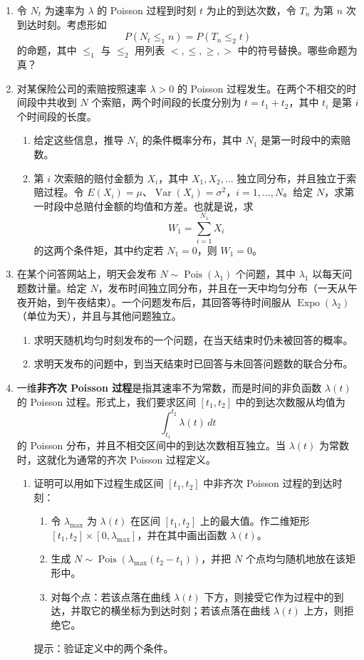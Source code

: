 \documentclass[UTF8,12pt,a4paper,fontset=fandol]{ctexart}
\begin{document}
\begin{enumerate}
  \item 令 $N_t$ 为速率为 $\lambda$ 的 Poisson 过程到时刻 $t$ 为止的到达次数，令 $T_n$ 为第 $n$ 次到达时刻。考虑形如
  \[
    P(N_t \le_1 n)=P(T_n \le_2 t)
  \]
  的命题，其中 $\le_1$ 与 $\le_2$ 用列表 $<,\le,\ge,>$ 中的符号替换。哪些命题为真？

  \item 对某保险公司的索赔按照速率 $\lambda>0$ 的 Poisson 过程发生。在两个不相交的时间段中共收到 $N$ 个索赔，两个时间段的长度分别为 $t=t_1+t_2$，其中 $t_i$ 是第 $i$ 个时间段的长度。
  \begin{enumerate}
    \item 给定这些信息，推导 $N_1$ 的条件概率分布，其中 $N_1$ 是第一时段中的索赔数。
    \item 第 $i$ 次索赔的赔付金额为 $X_i$，其中 $X_1,X_2,\ldots$ 独立同分布，并且独立于索赔过程。令 $E(X_i)=\mu$、$\operatorname{Var}(X_i)=\sigma^2$，$i=1,\ldots,N$。给定 $N$，求第一时段中总赔付金额的均值和方差。也就是说，求
    \[
      W_1=\sum_{i=1}^{N_1}X_i
    \]
    的这两个条件矩，其中约定若 $N_1=0$，则 $W_1=0$。
  \end{enumerate}

  \item 在某个问答网站上，明天会发布 $N\sim\operatorname{Pois}(\lambda_1)$ 个问题，其中 $\lambda_1$ 以每天问题数计量。给定 $N$，发布时间独立同分布，并且在一天中均匀分布（一天从午夜开始，到午夜结束）。一个问题发布后，其回答等待时间服从 $\operatorname{Expo}(\lambda_2)$（单位为天），并且与其他问题独立。
  \begin{enumerate}
    \item 求明天随机均匀时刻发布的一个问题，在当天结束时仍未被回答的概率。
    \item 求明天发布的问题中，到当天结束时已回答与未回答问题数的联合分布。
  \end{enumerate}

  \item 一维\textbf{非齐次 Poisson 过程}是指其速率不为常数，而是时间的非负函数 $\lambda(t)$ 的 Poisson 过程。形式上，我们要求区间 $[t_1,t_2]$ 中的到达次数服从均值为
  \[
    \int_{t_1}^{t_2}\lambda(t)\,dt
  \]
  的 Poisson 分布，并且不相交区间中的到达次数相互独立。当 $\lambda(t)$ 为常数时，这就化为通常的齐次 Poisson 过程定义。
  \begin{enumerate}
    \item 证明可以用如下过程生成区间 $[t_1,t_2]$ 中非齐次 Poisson 过程的到达时刻：
    \begin{enumerate}
      \item 令 $\lambda_{\max}$ 为 $\lambda(t)$ 在区间 $[t_1,t_2]$ 上的最大值。作二维矩形 $[t_1,t_2]\times[0,\lambda_{\max}]$，并在其中画出函数 $\lambda(t)$。
      \item 生成 $N\sim\operatorname{Pois}(\lambda_{\max}(t_2-t_1))$，并把 $N$ 个点均匀随机地放在该矩形中。
      \item 对每个点：若该点落在曲线 $\lambda(t)$ 下方，则接受它作为过程中的到达，并取它的横坐标为到达时刻；若该点落在曲线 $\lambda(t)$ 上方，则拒绝它。
    \end{enumerate}
    提示：验证定义中的两个条件。


\end{enumerate}
\end{enumerate}
\end{document}

